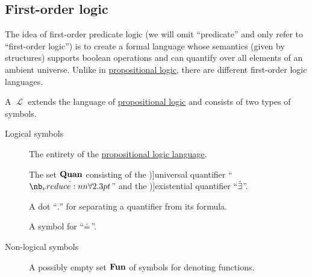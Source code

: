 \subsection{First-order logic}\label{subsec:first_order_logic}

The idea of first-order predicate logic (we will omit \enquote{predicate} and only refer to \enquote{first-order logic}) is to create a formal language whose semantics (given by structures) supports boolean operations and can quantify over all elements of an ambient universe. Unlike in \hyperref[subsec:propositional_logic]{propositional logic}, there are different first-order logic languages.

\begin{definition}\label{def:first_order_language}
  A  \( \mscrL \) extends the language of \hyperref[subsec:propositional_logic]{propositional logic} and consists of two types of symbols.

  \begin{description}
    \item[Logical symbols]
    \hfill
    \begin{thmenum}[series=def:first_order_language]
       The entirety of the \hyperref[subsec:propositional_logic]{propositional logic language}.

       The set \( \op*{Quan} \) consisting of the \term[ru=квантор общости (\cite[61]{Эдельман1975})]{universal quantifier} \enquote{\( \synforall \)} and the \term[ru=квантор существования (\cite[61]{Эдельман1975})]{existential quantifier} \enquote{\( \dot\exists \)}.

       A dot \enquote{\( . \)} for separating a quantifier from its formula.

       A symbol for  \enquote{\( \doteq \)}.
    \end{thmenum}

    \item[Non-logical symbols]
    \hfill
    \begin{thmenum}[resume=def:first_order_language]
       A possibly empty  set \( \op*{Fun} \) of symbols for denoting functions.


\end{thmenum}
\end{description}
\end{definition}
